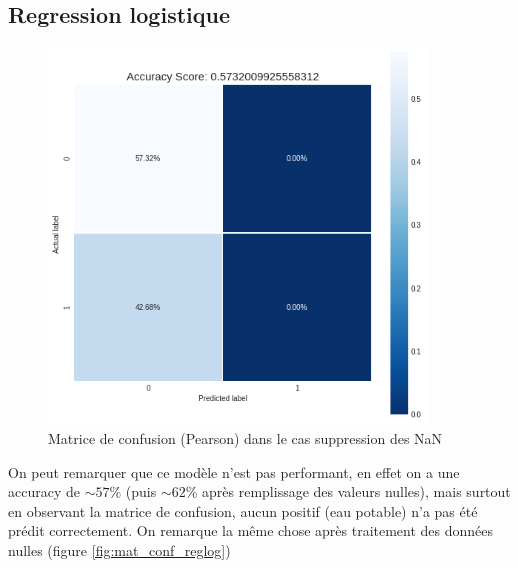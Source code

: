 \documentclass[12pt, a4paper]{article}
\begin{document}
    \subsection{Regression logistique}
    \begin{figure}[H]
           \centering
           \includegraphics[width=10cm]{images/confusion_matrix_log_case0.png}
           \caption{Matrice de confusion (Pearson) dans le cas suppression des NaN}
            \label{fig:reglog_0}
        \end{figure}
    On peut remarquer que ce modèle n'est pas performant, en effet on a une accuracy de $\sim57\%$ (puis $\sim62\%$ après remplissage des valeurs nulles), mais surtout en observant la matrice de confusion, aucun positif (eau potable) n'a pas été prédit correctement. On remarque la même chose après traitement des données nulles (figure \ref{fig:mat_conf_reglog})
\end{document}
